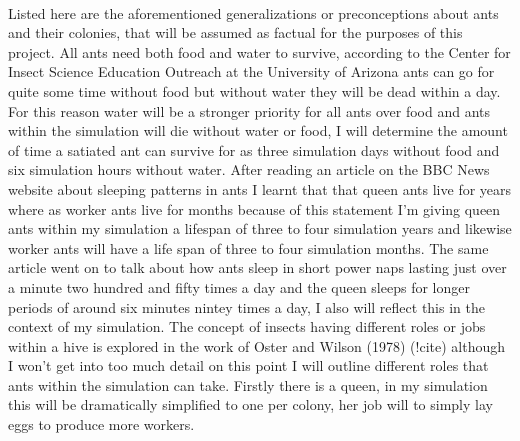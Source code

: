 \documentclass{report}
\begin{document}
\paragraph{}Listed here are the aforementioned generalizations or preconceptions about ants and their colonies, that will be assumed as factual for the purposes of this project. All ants need both food and water to survive, according to the Center for Insect Science Education Outreach at the University of Arizona ants can go for quite some time without food but without water they will be dead within a day. For this reason water will be a stronger priority for all ants over food and ants within the simulation will die without water or food, I will determine the amount of time a satiated ant can survive for as three simulation days without food and six simulation hours without water. After reading an article on the BBC News website about sleeping patterns in ants I learnt that that queen ants live for years where as worker ants live for months because of this statement I'm giving queen ants within my simulation a lifespan of three to four simulation years and likewise worker ants will have a life span of three to four simulation months. The same article went on to talk about how ants sleep in short power naps lasting just over a minute two hundred and fifty times a day and the queen sleeps for longer periods of around six minutes nintey times a day, I also will reflect this in the context of my simulation. The concept of insects having different roles or jobs within a hive is explored in the work of Oster and Wilson (1978) (!cite) although I won't get into too much detail on this point I will outline different roles that ants within the simulation can take. Firstly there is a queen, in my simulation this will be dramatically simplified to one per colony, her job will to simply lay eggs to produce more workers.
\end{document}
